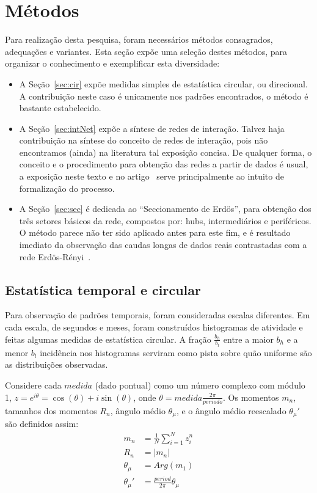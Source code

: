 \documentclass[a4paper,openright,12pt]{report} %
\begin{document}
\chapter{Métodos}
Para realização desta pesquisa, foram
necessários métodos consagrados, adequações
e variantes.
Esta seção expõe uma seleção destes métodos,
para organizar o conhecimento
e exemplificar esta diversidade:
\begin{itemize}
	\item A Seção~\ref{sec:cir} expõe medidas simples
de estatística circular, ou direcional.
A contribuição neste caso é unicamente nos
padrões encontrados, o método é bastante estabelecido.
	\item A Seção~\ref{sec:intNet} expõe a síntese de redes
		de interação. Talvez haja contribuição na síntese
		do conceito de redes de interação, pois não 
		encontramos (ainda) na literatura tal exposição
		concisa. De qualquer forma, o conceito e o procedimento
		para obtenção das redes a partir de dados é usual,
		a exposição neste texto e no artigo~\cite{timeS} serve
		principalmente ao intuito de formalização do
		processo.
	\item A Seção~\ref{sec:sec} é dedicada ao ``Seccionamento de Erdös'', para obtenção dos três setores básicos da rede, compostos por: hubs, intermediários e periféricos. O método parece não ter sido aplicado antes para este fim, e é resultado imediato da observação das caudas longas de dados reais contrastadas com a rede Erdös-Rényi~\cite{3setores}.
\end{itemize}


\section{Estatística temporal e circular}

Para observação de padrões temporais, foram consideradas escalas diferentes.
Em cada escala, de segundos e meses, foram construídos histogramas de atividade
e feitas algumas medidas de estatística circular.
A fração $\frac{b_h}{b_l}$ entre a maior $b_h $ e a menor $b_l$ incidência nos histogramas
serviram como pista sobre quão uniforme são as distribuições observadas.

Considere cada $ medida $ (dado pontual) como um número complexo com módulo 1, $z=e^{i\theta}=\cos(\theta)+i\sin(\theta)$, onde $\theta= medida \frac{2\pi}{periodo}$. Os momentos $m_n$, tamanhos dos momentos $R_n$, ângulo médio $\theta_\mu$, e o ângulo médio reescalado $\theta_\mu'$ são definidos assim:
\begin{align}\label{eq:cmom}
	m_n&=\frac{1}{N}\sum_{i=1}^N z_i^n \nonumber\\
	R_n&=|m_n|\\
	\theta_\mu&=Arg(m_1) \nonumber \\
	\theta_\mu'&=\frac{period}{2\pi} \theta_\mu \nonumber
\end{align}
\end{document}
